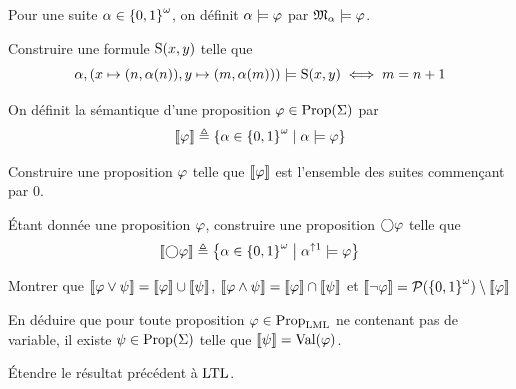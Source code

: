 \begin{problem}
  \noindent
  Pour une suite $\alpha\in{\{0,1\}}^{\omega}$, on définit $\alpha\models\varphi$ par
  $\mathfrak{M}_{\alpha}\models\varphi$.

  \begin{pbQuest}
  \item Construire une formule $\operatorname{S}(x,y)$ telle que
    \[\alpha,(x\mapsto (n,\alpha(n)),y\mapsto(m,\alpha(m)))\models\operatorname{S}(x,y)
    \iff m = n + 1\]
  \end{pbQuest}

  \noindent
  On définit la sémantique d'une proposition $\varphi\in\operatorname{Prop}(\Sigma)$ par
  \[\llbracket\varphi\rrbracket\triangleq \left\{ \alpha\in {\{0,1\}}^{\omega} \;\middle\vert\; \alpha\models\varphi \right\}\]
  \begin{pbQuest}
  \item Construire une proposition $\varphi$ telle que $\llbracket\varphi\rrbracket$ est
    l'ensemble des suites commençant par $0$.
  \item \'Etant donnée une proposition $\varphi$, construire une proposition
    $\mathbin{\bigcirc}\varphi$ telle que
    \[\llbracket\mathbin{\bigcirc}\varphi\rrbracket \triangleq
    \left\{ \alpha\in{\{0,1\}}^{\omega} \;\middle\vert\; \alpha^{\uparrow 1}\models\varphi \right\}\]
  \item Montrer que
    $\llbracket\varphi\lor\psi\rrbracket = \llbracket\varphi\rrbracket\cup\llbracket\psi\rrbracket$,
    $\llbracket\varphi\land\psi\rrbracket = \llbracket\varphi\rrbracket\cap\llbracket\psi\rrbracket$ et
    $\llbracket\lnot\varphi\rrbracket = \mathcal{P}({\{0,1\}}^{\omega})\setminus \llbracket\varphi\rrbracket$
  \item En déduire que pour toute proposition $\varphi\in\operatorname{Prop}_{\operatorname{LML}}$ ne
    contenant pas de variable, il existe $\psi \in \operatorname{Prop}(\Sigma)$ telle que
    $\llbracket\psi\rrbracket = \operatorname{Val}(\varphi)$.
  \item \'Etendre le résultat précédent à $\operatorname{LTL}$.
  \end{pbQuest}
\end{problem}
